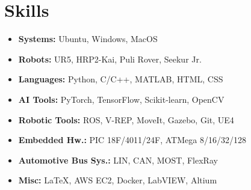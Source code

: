 \documentclass[10pt, oneside]{article} %
\begin{document}
\begin{paracol}{2}
\begin{itemize}[leftmargin=*, topsep=0pt, label={}]
\end{itemize}



\section{Skills}

\begin{itemize}[leftmargin=*, topsep=0pt, label={}]
	\item{\textbf{Systems:} Ubuntu, Windows, MacOS}
	\item{\textbf{Robots:} UR5, HRP2-Kai, Puli Rover, Seekur Jr.}
	\item{\textbf{Languages:} Python, C/C++, MATLAB, HTML, CSS}
	\item{\textbf{AI Tools:} PyTorch, TensorFlow, Scikit-learn, OpenCV} %
	\item{\textbf{Robotic Tools:} ROS, V-REP, MoveIt, Gazebo, Git, UE4}
	\item{\textbf{Embedded Hw.:} PIC 18F/4011/24F, ATMega 8/16/32/128}
    \item{\textbf{Automotive Bus Sys.:} LIN, CAN, MOST, FlexRay}
    \item{\textbf{Misc:} \LaTeX, AWS EC2, Docker, LabVIEW, Altium}
    
\end{itemize}





\end{paracol}
\end{document}
